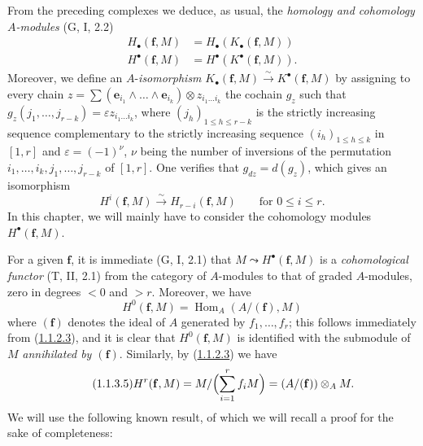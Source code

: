 \begin{env}[1.1.3]
\label{III.1.1.3}
From the preceding complexes we deduce, as usual, the \emph{homology and
cohomology $A$-modules} (G, I, 2.2)
\begin{align}
\label{III.1.1.3.1}
\tag{1.1.3.1}
H_\bullet(\mathbf f,M)&=H_\bullet(K_\bullet(\mathbf f,M))\\
\label{III.1.1.3.2}
\tag{1.1.3.2}
H^\bullet(\mathbf f,M)&=H^\bullet(K^\bullet(\mathbf f,M)).
\end{align}
Moreover, we define an $A$-\emph{isomorphism}
$K_\bullet(\mathbf f,M)\xrightarrow{\sim}K^\bullet(\mathbf f,M)$ by assigning to
every chain
$z=\sum(\mathbf e_{i_1}\wedge\ldots\wedge\mathbf e_{i_k})\otimes
z_{i_1\ldots i_k}$ the cochain $g_z$ such that
$g_z(j_1,\ldots,j_{r-k})=\varepsilon z_{i_1\ldots i_k}$, where
$(j_h)_{1\leq h\leq r-k}$ is the strictly increasing sequence complementary
to the strictly increasing sequence $(i_h)_{1\leq h\leq k}$ in $[1,r]$ and
$\varepsilon=(-1)^\nu$, $\nu$ being the number of inversions of the
permutation $i_1,\ldots,i_k,j_1,\ldots,j_{r-k}$ of $[1,r]$. One verifies that
$g_{dz}=d(g_z)$, which gives an isomorphism
\begin{equation}
\label{III.1.1.3.3}
\tag{1.1.3.3}
H^i(\mathbf f,M)\xrightarrow{\sim}H_{r-i}(\mathbf f,M)
\qquad\text{for }0\leq i\leq r.
\end{equation}
In this chapter, we will mainly have to consider the cohomology modules
$H^\bullet(\mathbf f,M)$.

For a given $\mathbf f$, it is immediate (G, I, 2.1) that
$M\leadsto H^\bullet(\mathbf f,M)$ is a \emph{cohomological functor}
(T, II, 2.1) from the category of $A$-modules to that of graded
$A$-modules, zero in degrees $<0$ and $>r$. Moreover, we have
\begin{equation}
\label{III.1.1.3.4}
\tag{1.1.3.4}
H^0(\mathbf f,M)=\operatorname{Hom}_A(A/(\mathbf f),M)
\end{equation}
where $(\mathbf f)$ denotes the ideal of $A$ generated by
$f_1,\ldots,f_r$; this follows immediately from
(\hyperref[III.1.1.2.3]{1.1.2.3}), and it is clear that
$H^0(\mathbf f,M)$ is identified with the submodule of $M$ \emph{annihilated
by $(\mathbf f)$}. Similarly, by
(\hyperref[III.1.1.2.3]{1.1.2.3}) we have
\begin{equation}
\label{III.1.1.3.5}
\tag{1.1.3.5}
H^r(\mathbf f,M)=M/\Bigl(\sum_{i=1}^r f_iM\Bigr)
=(A/(\mathbf f))\otimes_A M.
\end{equation}
We will use the following known result, of which we will recall a
proof for the sake of completeness:
\end{env}

